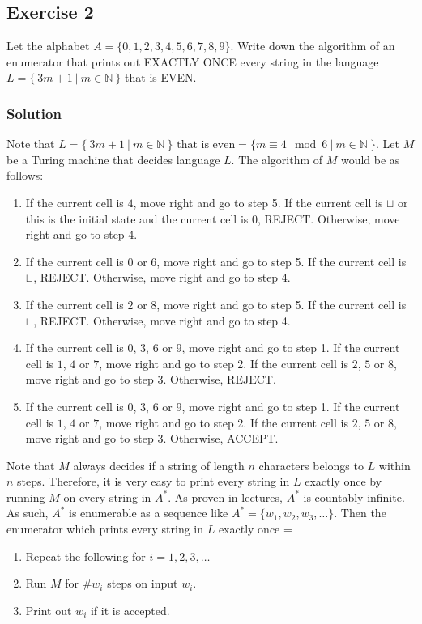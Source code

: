 \documentclass[12pt]{article}
\begin{document}
\newpage
\subsection*{Exercise 2}

Let the alphabet $A = \{ 0, 1, 2, 3, 4, 5, 6, 7, 8, 9 \}$. Write
down the algorithm of an enumerator that prints out EXACTLY ONCE
every string in the language $L = \{\ 3m + 1\ |\ m \in \mathbb{N}\ \}$
that is EVEN.

\subsubsection*{Solution}

Note that $L = \{\ 3m + 1\ |\ m \in \mathbb{N}\ \} \text{ that is even} = \{ m \equiv 4 \mod 6\ |\ m \in \mathbb{N}\ \}$.
Let $M$ be a Turing machine that decides language $L$.
The algorithm of $M$ would be as follows:
\begin{enumerate}
	\item
	If the current cell is $4$, move right and go to step 5.
	If the current cell is $\sqcup$ or this is the initial state and the current cell is $0$, REJECT.
	Otherwise, move right and go to step 4.
	\item
	If the current cell is $0$ or $6$, move right and go to step 5.
	If the current cell is $\sqcup$, REJECT.
	Otherwise, move right and go to step 4.
	\item
	If the current cell is $2$ or $8$, move right and go to step 5.
	If the current cell is $\sqcup$, REJECT.
	Otherwise, move right and go to step 4.
	\item
	If the current cell is $0$, $3$, $6$ or $9$, move right and go to step 1.
	If the current cell is $1$, $4$ or $7$, move right and go to step 2.
	If the current cell is $2$, $5$ or $8$, move right and go to step 3.
	Otherwise, REJECT.
	\item
	If the current cell is $0$, $3$, $6$ or $9$, move right and go to step 1.
	If the current cell is $1$, $4$ or $7$, move right and go to step 2.
	If the current cell is $2$, $5$ or $8$, move right and go to step 3.
	Otherwise, ACCEPT.
\end{enumerate}

Note that $M$ always decides if a string of length $n$ characters belongs to $L$ within $n$ steps.
Therefore, it is very easy to print every string in $L$ exactly once by running $M$ on every string in $A^{*}$.
As proven in lectures, $A^{*}$ is countably infinite.
As such, $A^{*}$ is enumerable as a sequence like $A^{*} = \{ w_1, w_2, w_3, \ldots \}$.
Then the enumerator which prints every string in $L$ exactly once =
\begin{enumerate}
	\item Repeat the following for $i = 1,2,3,\ldots$
	\item Run $M$ for $\#{w_i}$ steps on input $w_i$.
	\item Print out $w_i$ if it is accepted.
\end{enumerate}
\end{document}
